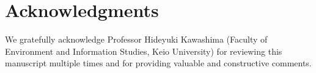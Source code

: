 \section*{Acknowledgments}
We gratefully acknowledge Professor Hideyuki Kawashima (Faculty of Environment and Information Studies, Keio University) for reviewing this manuscript multiple times and for providing valuable and constructive comments.